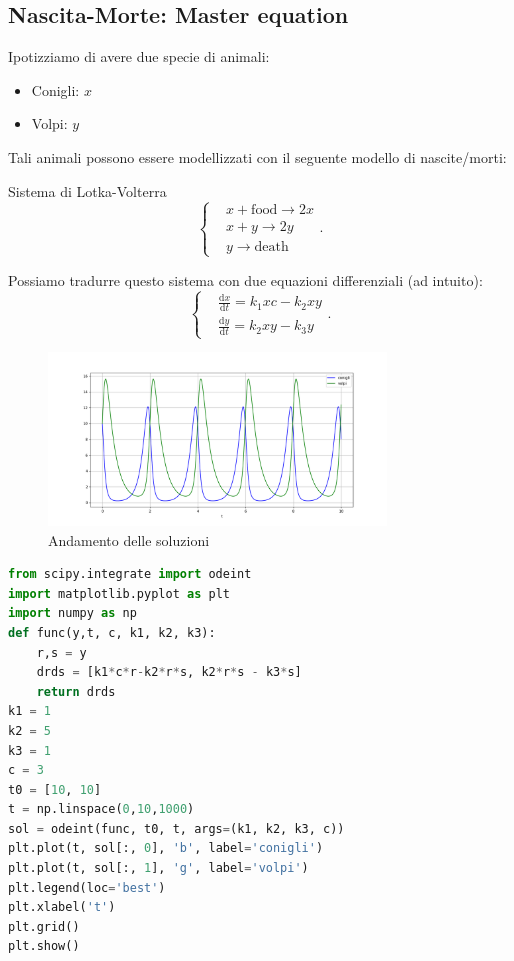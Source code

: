 \subsection{Nascita-Morte: Master equation}%
Ipotizziamo di avere due specie di animali:
\begin{itemize}
    \item Conigli: $x$ 
    \item Volpi: $y$ 
\end{itemize}
Tali animali possono essere modellizzati con il seguente modello di nascite/morti:
\begin{greenbox}{Sistema di Lotka-Volterra}
 \[
    \begin{cases}
	&x+\text{food}\to 2x\\
	&x+y\to 2y\\
	&y\to \text{death}
    \end{cases}
.\]    
\end{greenbox}
\noindent
Possiamo tradurre questo sistema con due equazioni differenziali (ad intuito):
\[
    \begin{cases}
	&\frac{\text{d} x}{\text{d} t} =k_1xc-k_2xy\\
	&\frac{\text{d} y}{\text{d} t} = k_2xy-k_3y
    \end{cases}
.\] 
\begin{figure}[H]
    \centering
    \includegraphics[width=0.8\textwidth]{figures/Volpi-Conigli.png}
    \caption{\scriptsize Andamento delle soluzioni}
    \label{fig:conigli}
\end{figure}
\begin{lstlisting}[language=Python]
from scipy.integrate import odeint
import matplotlib.pyplot as plt
import numpy as np
def func(y,t, c, k1, k2, k3):
    r,s = y 
    drds = [k1*c*r-k2*r*s, k2*r*s - k3*s]
    return drds
k1 = 1
k2 = 5
k3 = 1
c = 3
t0 = [10, 10]
t = np.linspace(0,10,1000)
sol = odeint(func, t0, t, args=(k1, k2, k3, c))
plt.plot(t, sol[:, 0], 'b', label='conigli')
plt.plot(t, sol[:, 1], 'g', label='volpi')
plt.legend(loc='best')
plt.xlabel('t')
plt.grid()
plt.show()
\end{lstlisting}
